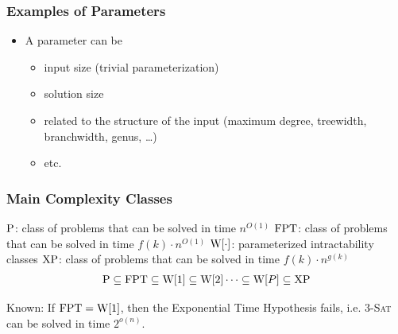 
\begin{frame}
 \frametitle{Examples of Parameters}


  \slides{\bigskip}
  \begin{itemize}
   \item A parameter can be
   \begin{itemize}
    \item input size (trivial parameterization)
    \item solution size
    \item related to the structure of the input (maximum degree, treewidth, branchwidth, genus, \ldots)
    \item etc.
   \end{itemize}
  \end{itemize}

\end{frame}


\begin{frame}
 \frametitle{Main Complexity Classes}

 \noindent
 $\P$: class of problems that can be solved in time $n^{O(1)}$\newline
 $\FPT$: class of problems that can be solved in time $f(k) \cdot n^{O(1)}$\newline
 $\W[\cdot]$: parameterized intractability classes\newline
 $\XP$: class of problems that can be solved in time $f(k) \cdot n^{g(k)}$ %
%
 \slides{\bigskip}
 \begin{align*}
  \P \subseteq \FPT \subseteq \W[1] \subseteq \W[2] \dots \subseteq \W[P] \subseteq \XP
 \end{align*}
 \slides{\bigskip}

 \noindent
 Known: If $\FPT = \W[1]$, then the Exponential Time Hypothesis fails,
        i.e. 3-\textsc{Sat} can be solved in time $2^{o(n)}$.

\end{frame}

